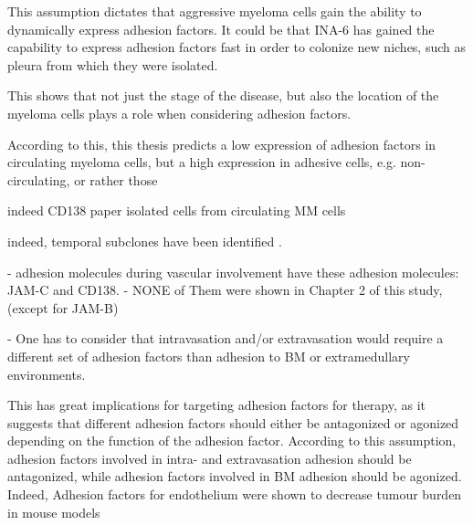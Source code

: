 
This assumption dictates that aggressive myeloma cells gain the ability
to dynamically express adhesion factors.
It could be that INA-6 has gained the capability to express adhesion factors
fast in order to colonize new niches, such as pleura from which they were
isolated.

This shows that not just the stage of the disease, but also the location of the
myeloma cells plays a role when considering adhesion factors.

According to this, this thesis
predicts a low expression of adhesion factors in circulating myeloma cells,
but a high expression in adhesive cells, e.g. non-circulating, or rather those

indeed CD138 paper isolated cells from circulating MM cells \cite{akhmetzyanovaDynamicCD138Surface2020}

indeed, temporal subclones have been identified \cite{keatsClonalCompetitionAlternating2012}.

%
\label{sec:discussion_subsets_adhesion_factors}%

- adhesion molecules during vascular involvement have these adhesion molecules: JAM-C
and CD138.
- NONE of Them were shown in Chapter 2 of this study, (except for JAM-B)


- One has to consider that intravasation and/or extravasation would require a different
set of adhesion factors than adhesion to BM or extramedullary environments.

This has great implications for targeting adhesion factors for therapy, as it
suggests that different adhesion factors should either be antagonized or
agonized depending on the function of the adhesion factor. According to this
assumption, adhesion factors involved in intra- and extravasation adhesion should be
antagonized, while adhesion factors involved in BM adhesion  should be agonized. Indeed, Adhesion factors for endothelium
were shown to decrease tumour burden in mouse models \cite{asosinghUniquePathwayHoming2001a,mrozikTherapeuticTargetingNcadherin2015}

